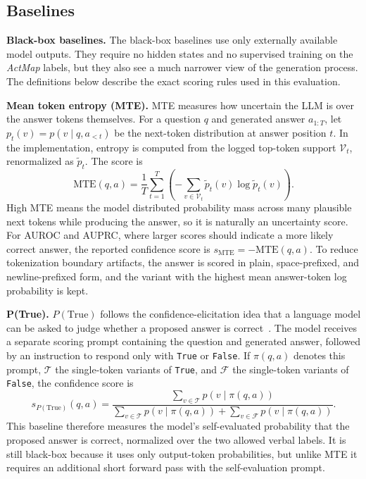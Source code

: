 \documentclass{article}
\newcommand{\actmap}{\textit{ActMap}}
\begin{document}
\subsection{Baselines}

\textbf{Black-box baselines.} The black-box baselines use only externally available model outputs. They require no hidden states and no supervised training on the \actmap{} labels, but they also see a much narrower view of the generation process. The definitions below describe the exact scoring rules used in this evaluation.

\textbf{Mean token entropy (MTE).} MTE measures how uncertain the LLM is over the answer tokens themselves. For a question \(q\) and generated answer \(a_{1:T}\), let \(p_t(v)=p(v \mid q,a_{<t})\) be the next-token distribution at answer position \(t\). In the implementation, entropy is computed from the logged top-token support \(\mathcal{V}_t\), renormalized as \(\tilde p_t\). The score is
\[
    \mathrm{MTE}(q,a)
    =
    \frac{1}{T}\sum_{t=1}^{T}
    \left(
        -\sum_{v \in \mathcal{V}_t} \tilde p_t(v)\log \tilde p_t(v)
    \right).
\]
High MTE means the model distributed probability mass across many plausible next tokens while producing the answer, so it is naturally an uncertainty score. For AUROC and AUPRC, where larger scores should indicate a more likely correct answer, the reported confidence score is \(s_{\mathrm{MTE}}=-\mathrm{MTE}(q,a)\). To reduce tokenization boundary artifacts, the answer is scored in plain, space-prefixed, and newline-prefixed form, and the variant with the highest mean answer-token log probability is kept.

\textbf{P(True).} \(P(\mathrm{True})\) follows the confidence-elicitation idea that a language model can be asked to judge whether a proposed answer is correct~\cite{kadavath2022}. The model receives a separate scoring prompt containing the question and generated answer, followed by an instruction to respond only with \texttt{True} or \texttt{False}. If \(\pi(q,a)\) denotes this prompt, \(\mathcal{T}\) the single-token variants of \texttt{True}, and \(\mathcal{F}\) the single-token variants of \texttt{False}, the confidence score is
\[
    s_{P(\mathrm{True})}(q,a)
    =
    \frac{\sum_{v \in \mathcal{T}} p(v \mid \pi(q,a))}
    {\sum_{v \in \mathcal{T}} p(v \mid \pi(q,a)) +
     \sum_{v \in \mathcal{F}} p(v \mid \pi(q,a))}.
\]
This baseline therefore measures the model's self-evaluated probability that the proposed answer is correct, normalized over the two allowed verbal labels. It is still black-box because it uses only output-token probabilities, but unlike MTE it requires an additional short forward pass with the self-evaluation prompt.
\end{document}
